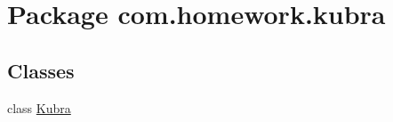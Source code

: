 \hypertarget{namespacecom_1_1homework_1_1kubra}{}\section{Package com.\+homework.\+kubra}
\label{namespacecom_1_1homework_1_1kubra}
\subsection*{Classes}
\begin{DoxyCompactItemize}
\item 
class \hyperlink{classcom_1_1homework_1_1kubra_1_1_kubra}{Kubra}
\end{DoxyCompactItemize}
